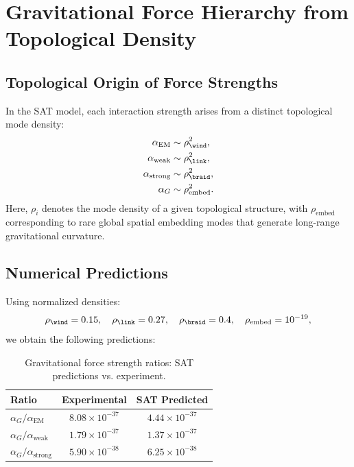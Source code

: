 

\section{Gravitational Force Hierarchy from Topological Density}
\label{sec:gravity_force_hierarchy}

\subsection{Topological Origin of Force Strengths}

In the SAT model, each interaction strength arises from a distinct
topological mode density:
\[
\begin{aligned}
\alpha_{\text{EM}} &\sim \rho_{\wind}^{2}, \\
\alpha_{\text{weak}} &\sim \rho_{\link}^{2}, \\
\alpha_{\text{strong}} &\sim \rho_{\braid}^{2}, \\
\alpha_G &\sim \rho_{\text{embed}}^{2}.
\end{aligned}
\]
Here, $\rho_i$ denotes the mode density of a given topological structure,
with $\rho_{\text{embed}}$ corresponding to rare global spatial embedding
modes that generate long-range gravitational curvature.

\subsection{Numerical Predictions}

Using normalized densities:
\[
\rho_{\wind} = 0.15, \quad
\rho_{\link} = 0.27, \quad
\rho_{\braid} = 0.4, \quad
\rho_{\text{embed}} = 10^{-19},
\]
we obtain the following predictions:

\begin{table}[ht]
\centering
\caption{Gravitational force strength ratios: SAT predictions vs. experiment.}
\label{tab:gravity_ratios}
\begin{tabular}{lcc}
\toprule
Ratio & Experimental & SAT Predicted \\
\midrule
$\alpha_G / \alpha_{\text{EM}}$   & $8.08 \times 10^{-37}$ & $4.44 \times 10^{-37}$ \\
$\alpha_G / \alpha_{\text{weak}}$ & $1.79 \times 10^{-37}$ & $1.37 \times 10^{-37}$ \\
$\alpha_G / \alpha_{\text{strong}}$ & $5.90 \times 10^{-38}$ & $6.25 \times 10^{-38}$ \\
\bottomrule
\end{tabular}
\end{table}

